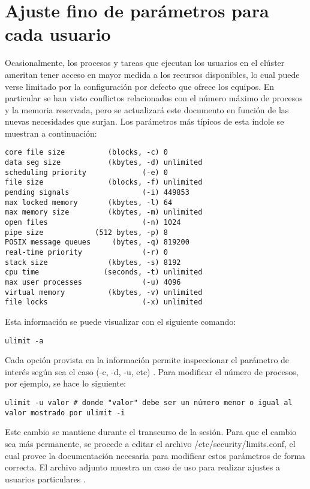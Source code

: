 \chapter{Ajuste fino de parámetros para cada usuario}
Ocasionalmente, los procesos y tareas que ejecutan los usuarios en el clúster ameritan tener acceso en mayor medida a los recursos disponibles, lo cual puede verse limitado por la configuración por defecto que ofrece los equipos. En particular se han visto conflictos relacionados con el número máximo de procesos y la memoria reservada, pero se actualizará este documento en función de las nuevas necesidades que surjan. Los parámetros más típicos de esta índole se muestran a continuación:

\begin{lstlisting}
core file size          (blocks, -c) 0
data seg size           (kbytes, -d) unlimited
scheduling priority             (-e) 0
file size               (blocks, -f) unlimited
pending signals                 (-i) 449853
max locked memory       (kbytes, -l) 64
max memory size         (kbytes, -m) unlimited
open files                      (-n) 1024
pipe size            (512 bytes, -p) 8
POSIX message queues     (bytes, -q) 819200
real-time priority              (-r) 0
stack size              (kbytes, -s) 8192
cpu time               (seconds, -t) unlimited
max user processes              (-u) 4096
virtual memory          (kbytes, -v) unlimited
file locks                      (-x) unlimited
\end{lstlisting}

Esta información se puede visualizar con el siguiente comando:

\begin{lstlisting}
ulimit -a
\end{lstlisting}

Cada opción provista en la información permite inspeccionar el parámetro de interés según sea el caso (-c, -d, -u, etc) \cite{finetuning00}. Para modificar el número de procesos, por ejemplo, se hace lo siguiente:

\begin{lstlisting}
ulimit -u valor # donde "valor" debe ser un número menor o igual al valor mostrado por ulimit -i
\end{lstlisting}

Este cambio se mantiene durante el transcurso de la sesión. Para que el cambio sea más permanente, se procede a editar el archivo /etc/security/limits.conf, el cual provee la documentación necesaria para modificar estos parámetros de forma correcta. El archivo adjunto muestra un caso de uso para realizar ajustes a usuarios particulares \cite{finetuning01}.



\clearpage